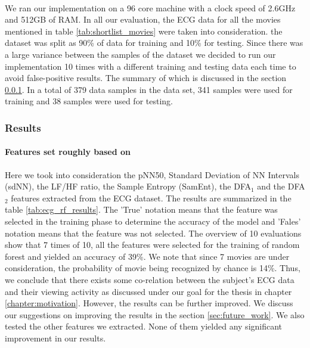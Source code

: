 \paragraph{} We ran our implementation on a 96 core machine with a clock speed of 2.6GHz and 512GB of RAM. In all our evaluation, the ECG data for all the movies mentioned in table \ref{tab:shortlist_movies} were taken into consideration. the dataset was split as 90\% of data for training and 10\% for testing. Since there was a large variance between the samples of the dataset we decided to run our implementation 10 times with a different training and testing data each time to avoid false-positive results. The summary of which is discussed in the section \ref{sec:ecg_analysis_results}. In a total of 379 data samples in the data set, 341 samples were used for training and 38 samples were used for testing. 

\subsubsection{Results}
\label{sec:ecg_analysis_results}
\paragraph{Features set roughly based on \citeauthor{zhao_emotion_2016}} Here we took into consideration the pNN50, Standard Deviation of NN Intervals (sdNN), the LF/HF ratio, the Sample Entropy (SamEnt), the DFA$_{1}$ and the DFA$_{2}$ features extracted from the ECG dataset. The results are summarized in the table \ref{tab:ecg_rf_results}. The 'True' notation means that the feature was selected in the training phase to determine the accuracy of the model and 'Fales' notation means that the feature was not selected. The overview of 10 evaluations show that 7 times of 10, all the features were selected for the training of random forest and yielded an accuracy of 39\%. We note that since 7 movies are under consideration, the probability of movie being recognized by chance is 14\%. Thus, we conclude that there exists some co-relation between the subject's ECG data and their viewing activity as discussed under our goal for the thesis in chapter \ref{chapter:motivation}. However, the results can be further improved. We discuss our suggestions on improving the results in the section \ref{sec:future_work}. We also tested the other features we extracted. None of them yielded any significant improvement in our results.

